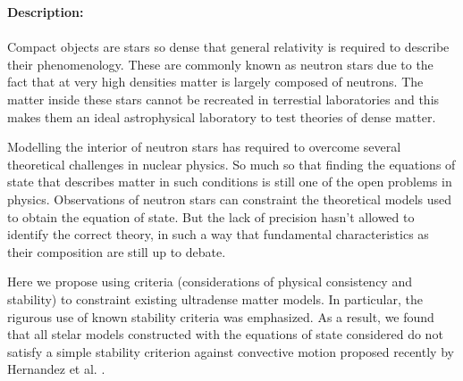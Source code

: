 \begin{abstract1}
    \begin{spacing}{1.0}
    \noindent \textbf{Description:}\\ \\
    \noindent Compact objects are stars so dense that general relativity is required to describe their phenomenology. These are commonly known as neutron stars due to the fact that at very high densities matter is largely composed of neutrons. The matter inside these stars cannot be recreated in terrestial laboratories and this makes them an ideal astrophysical laboratory to test theories of dense matter.
    
    Modelling the interior of neutron stars has required to overcome several theoretical challenges in nuclear physics. So much so that finding the equations of state that describes matter in such conditions is still one of the open problems in physics. Observations of neutron stars can constraint the theoretical models used to obtain the equation of state. But the lack of precision hasn't allowed to identify the correct theory, in such a way that fundamental characteristics as their composition are still up to debate.
    
    Here we propose using  criteria (considerations of physical consistency and stability) to constraint existing ultradense matter models. In particular, the rigurous use of known stability criteria was emphasized. As a result, we found that all stelar models constructed with the equations of state considered do not satisfy a simple stability criterion against convective motion proposed recently by Hernandez et al. \cite{Hernandez2018}.
    \end{spacing}
\end{abstract1}